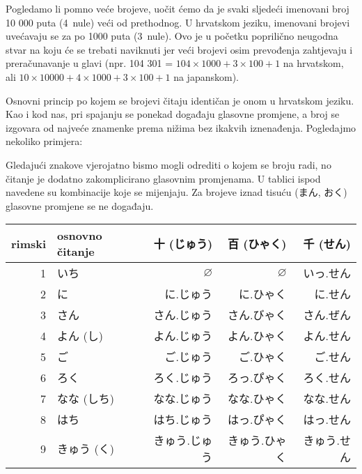 	\vspace{5pt}
	Pogledamo li pomno veće brojeve, uočit ćemo da je svaki sljedeći imenovani broj 10 000 puta (4~nule) veći od prethodnog. U hrvatskom jeziku, imenovani brojevi uvećavaju se za po 1000 puta (3~nule). Ovo je u početku poprilično neugodna stvar na koju će se trebati naviknuti jer veći brojevi osim prevođenja zahtjevaju i preračunavanje u glavi (npr. 104 301 = $104\times 1000 + 3\times 100 + 1$ na hrvatskom, ali $10\times 10 000 + 4\times 1000 + 3\times 100 + 1$ na japanskom).

	\newpage
	
	Osnovni princip po kojem se brojevi čitaju identičan je onom u hrvatskom jeziku. Kao i kod nas, pri spajanju se ponekad događaju glasovne promjene, a broj se izgovara od najveće znamenke prema nižima bez ikakvih iznenađenja. Pogledajmo nekoliko primjera:
	
	\begin{reibun}
	\end{reibun}

	Gledajući znakove vjerojatno bismo mogli odrediti o kojem se broju radi, no čitanje je dodatno zakomplicirano glasovnim promjenama. U tablici ispod navedene su kombinacije koje se mijenjaju. Za brojeve iznad tisuću (まん, おく) glasovne promjene se ne događaju.
	
	\vspace{5pt}
	\begin{table}[h]
		\centering
		\begin{tabular}{r l r r r}\toprule[2pt]
			rimski & osnovno čitanje & 十 (じゅう) & 百 (ひゃく) & 千 (せん)\\
			\midrule
			1			& いち & $\varnothing$ & $\varnothing$ & \colorbox{blue!10}{いっ.せん} \\
			2			& に & に.じゅう & に.ひゃく & に.せん \\
			3			& さん & さん.じゅう & \colorbox{blue!10}{さん.びゃく} & \colorbox{blue!10}{さん.ぜん} \\
			4			& よん (し\footnotemark[1]) & よん.じゅう & よん.ひゃく & よん.せん \\
			5			& ご & ご.じゅう & ご.ひゃく & ご.せん \\
			6			& ろく & ろく.じゅう & \colorbox{blue!10}{ろっ.ぴゃく} & ろく.せん \\
			7			& なな (しち\footnotemark[1]) & なな.じゅう & なな.ひゃく & なな.せん \\
			8			& はち & はち.じゅう & \colorbox{blue!10}{はっ.ぴゃく} & \colorbox{blue!10}{はっ.せん} \\
			9			& きゅう (く\footnotemark[1]) & きゅう.じゅう & きゅう.ひゃく & きゅう.せん \\
			\bottomrule
		\end{tabular}
	\end{table}

